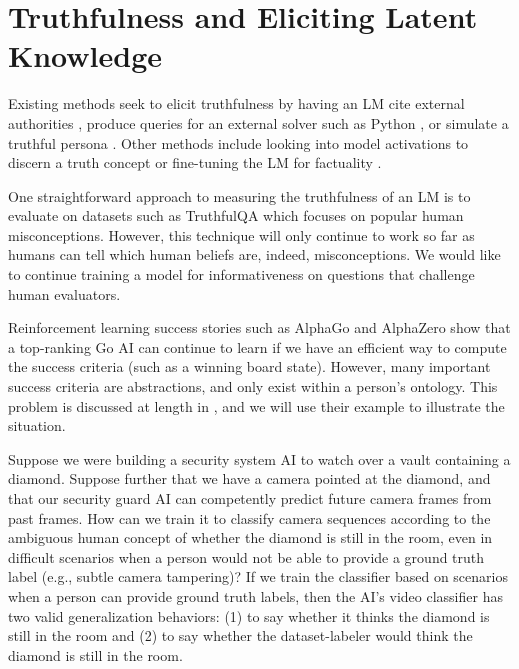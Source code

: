 \documentclass{article}
\begin{document}
\section{Truthfulness and Eliciting Latent Knowledge}
\label{app:truth}

Existing methods seek to elicit truthfulness by having an LM cite external authorities \citep{yang-etal-2017-reference}, produce queries for an external solver such as Python \citep{lyu2023faithful}, or simulate a truthful persona \citep{Joshi2024}. Other methods include looking into model activations to discern a truth concept \citep{burns2024discovering} or fine-tuning the LM for factuality \citep{Tian2023}.

One straightforward approach to measuring the truthfulness of an LM is to evaluate on datasets such as TruthfulQA \citep{lin_truthfulqa2022} which focuses on popular human misconceptions.
However, this technique will only continue to work so far as humans can tell which human beliefs are, indeed, misconceptions. 
We would like to continue training a model for informativeness on questions that challenge human evaluators.

Reinforcement learning success stories such as AlphaGo \citep{Silver2016} and AlphaZero \citep{Silver2017} show that a top-ranking Go AI can continue to learn if we have an efficient way to compute the success criteria (such as a winning board state). However, many important success criteria are abstractions, and only exist within a person's ontology. This problem is discussed at length in \citet{christiano2021eliciting}, and we will use their example to illustrate the situation. 

Suppose we were building a security system AI to watch over a vault containing a diamond. Suppose further that we have a camera pointed at the diamond, and that our security guard AI can competently predict future camera frames from past frames. How can we train it to classify camera sequences according to the ambiguous human concept of whether the diamond is still in the room, even in difficult scenarios when a person would not be able to provide a ground truth label (e.g., subtle camera tampering)? If we train the classifier based on scenarios when a person can provide ground truth labels, then the AI's video classifier has two valid generalization behaviors: (1) to say whether it thinks the diamond is still in the room and (2) to say whether the dataset-labeler would think the diamond is still in the room. 
\end{document}
